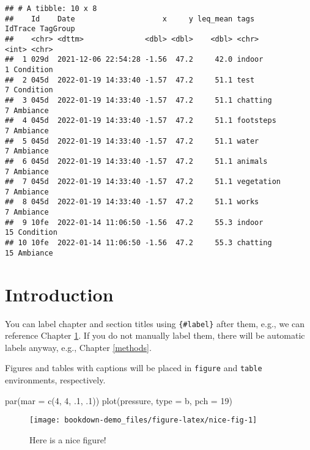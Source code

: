 \documentclass[
]{book}
\newenvironment{Shaded}{\begin{snugshade}}{\end{snugshade}}
\newcommand{\AttributeTok}[1]{\textcolor[rgb]{0.77,0.63,0.00}{#1}}
\newcommand{\DecValTok}[1]{\textcolor[rgb]{0.00,0.00,0.81}{#1}}
\newcommand{\FunctionTok}[1]{\textcolor[rgb]{0.00,0.00,0.00}{#1}}
\newcommand{\NormalTok}[1]{#1}
\newcommand{\StringTok}[1]{\textcolor[rgb]{0.31,0.60,0.02}{#1}}
\begin{document}
\begin{verbatim}
## # A tibble: 10 x 8
##    Id    Date                    x     y leq_mean tags       IdTrace TagGroup 
##    <chr> <dttm>              <dbl> <dbl>    <dbl> <chr>        <int> <chr>    
##  1 029d  2021-12-06 22:54:28 -1.56  47.2     42.0 indoor           1 Condition
##  2 045d  2022-01-19 14:33:40 -1.57  47.2     51.1 test             7 Condition
##  3 045d  2022-01-19 14:33:40 -1.57  47.2     51.1 chatting         7 Ambiance 
##  4 045d  2022-01-19 14:33:40 -1.57  47.2     51.1 footsteps        7 Ambiance 
##  5 045d  2022-01-19 14:33:40 -1.57  47.2     51.1 water            7 Ambiance 
##  6 045d  2022-01-19 14:33:40 -1.57  47.2     51.1 animals          7 Ambiance 
##  7 045d  2022-01-19 14:33:40 -1.57  47.2     51.1 vegetation       7 Ambiance 
##  8 045d  2022-01-19 14:33:40 -1.57  47.2     51.1 works            7 Ambiance 
##  9 10fe  2022-01-14 11:06:50 -1.56  47.2     55.3 indoor          15 Condition
## 10 10fe  2022-01-14 11:06:50 -1.56  47.2     55.3 chatting        15 Ambiance
\end{verbatim}

\hypertarget{intro}{%
\chapter{Introduction}\label{intro}}

You can label chapter and section titles using \texttt{\{\#label\}} after them, e.g., we can reference Chapter \ref{intro}. If you do not manually label them, there will be automatic labels anyway, e.g., Chapter \ref{methods}.

Figures and tables with captions will be placed in \texttt{figure} and \texttt{table} environments, respectively.

\begin{Shaded}
\begin{Highlighting}[]
\FunctionTok{par}\NormalTok{(}\AttributeTok{mar =} \FunctionTok{c}\NormalTok{(}\DecValTok{4}\NormalTok{, }\DecValTok{4}\NormalTok{, .}\DecValTok{1}\NormalTok{, .}\DecValTok{1}\NormalTok{))}
\FunctionTok{plot}\NormalTok{(pressure, }\AttributeTok{type =} \StringTok{\textquotesingle{}b\textquotesingle{}}\NormalTok{, }\AttributeTok{pch =} \DecValTok{19}\NormalTok{)}
\end{Highlighting}
\end{Shaded}

\begin{figure}

{\centering \texttt{[image: bookdown-demo\_files/figure-latex/nice-fig-1]} 

}

\caption{Here is a nice figure!}\label{fig:nice-fig}
\end{figure}
\end{document}

